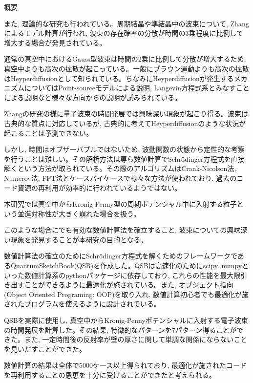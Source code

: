 \documentclass[a4paper, lualatex]{bxjsarticle}
\begin{document}
\begin{section}{概要}
    \par また, 理論的な研究も行われている。周期結晶や準結晶中の波束について, Zhangによるモデル計算\cite{Zhang}が行われ, 波束の存在確率の分散が時間の3乗程度に比例して増大する場合が発見されている。
    \par 通常の真空中におけるGauss型波束は時間の2乗に比例して分散が増大する\cite{Koide}ため, 真空中よりも高次の拡散が起こっている。一般にブラウン運動よりも高次の拡散はHeyperdiffusionとして知られている。ちなみにHeyperdiffusionが発生するメカニズムについてはPoint-sourceモデルによる説明\cite{Huf}, Langevin方程式系とみなすことによる説明\cite{Siegle}など様々な方向からの説明が試みられている。
    \par Zhangの研究の様に量子波束の時間発展では興味深い現象が起こり得る。波束は古典的な質点に対応しているが, 古典的に考えてHeyperdiffusionのような状況が起こることは予測できない。
    \par しかし, 時間はオブザーバブルではないため, 波動関数の状態から定性的な考察を行うことは難しい。その解析方法は専ら数値計算でSchrödinger方程式を直接解くという方法が取られている\cite{Zhang, Moyer, Maeda, Hosaka, Goto, Futohashi}。その際のアルゴリズムはCrank-Nicolson法\cite{Zhang}, Numerov法\cite{Moyer}, FFT法\cite{Goto, Futohashi}とケースバイケースで様々な方法が使われており, 過去のコード資源の再利用が効率的に行われているようではない。
    \par 本研究では真空中からKronig-Penny型の周期ポテンシャル中に入射する粒子という並進対称性が大きく崩れた場合を扱う。
    \par このような場合にでも有効な数値計算法を確立すること, 波束についての興味深い現象を発見することが本研究の目的となる。
    \par 数値計算法の確立のためにSchrödinger方程式を解くためのフレームワークであるQuantumSketchBook(QSB)\cite{QSB}を作成した。QSBは高速化のためにscipy, numpyといった数値計算系のpythonパッケージに依存しており, これらの性能を最大限引き出すことができるように最適化が施されている。また, オブジェクト指向(Object Oriented Programing: OOP)を取り入れ, 数値計算初心者でも最適化が施されたプログラムを使えるように設計されている。
    \par QSBを実際に使用し, 真空中からKronig-Pennyポテンシャルに入射する電子波束の時間発展を計算した。その結果, 特徴的なパターンを7パターン得ることができた。また, 一定時間後の反射率が壁の厚さに関して単調な関係にならないことを見いだすことができた。
    \par 数値計算の結果は全体で5000ケース以上得られており, 最適化が施されたコードを再利用することの恩恵を十分に受けることができたと考えられる。
\end{section}
\end{document}
